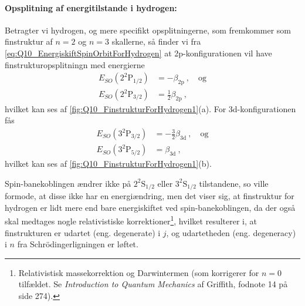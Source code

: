 \paragraph{Opsplitning af energitilstande i hydrogen:} Betragter vi hydrogen, og mere specifikt opsplitningerne, som fremkommer som finstruktur af $n = 2$ og $n = 3$ skallerne, så finder vi fra \cref{eq:Q10_EnergiskiftSpinOrbitForHydrogen} at 2p-konfigurationen vil have finstrukturopsplitningn med energierne
\begin{align}
    E_{SO}(2^2\text{P}_{1/2}) &= -\beta_{2\text{p}} \: , \quad \text{og} \\
    E_{SO}(2^2\text{P}_{3/2}) &= \frac{1}{2}\beta_{2\text{p}} \: ,
\end{align}
hvilket kan ses af \cref{fig:Q10_FinstrukturForHydrogen1}(a). For 3d-konfigurationen fås
\begin{align}
    E_{SO}(3^2\text{P}_{3/2}) &= -\frac{3}{2}\beta_{3\text{d}} \: , \quad \text{og} \\
    E_{SO}(3^2\text{P}_{5/2}) &= \beta_{3\text{d}} \: ,
\end{align}
hvilket kan ses af \cref{fig:Q10_FinstrukturForHydrogen1}(b).

Spin-banekoblingen ændrer ikke på $2^2\text{S}_{1/2}$ eller $3^2\text{S}_{1/2}$ tilstandene, so ville formode, at disse ikke har en energiændring, men det viser sig, at finstruktur for hydrogen er lidt mere end bare energiskiftet ved spin-banekoblingen, da der også skal medtages nogle relativistiske korrektioner\footnote{Relativistisk massekorrektion og Darwintermen (som korrigerer for $n=0$ tilfældet. Se \textit{Introduction to Quantum Mechanics} af Griffith, fodnote 14 på side 274).}, hvilket resulterer i, at finstrukturen er udartet (eng. degenerate) i $j$, og udartetheden (eng. degeneracy) i $n$ fra Schrödingerligningen er løftet.

